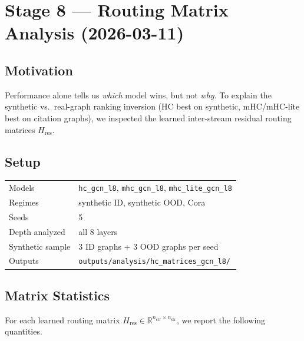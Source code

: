 \documentclass[11pt,a4paper]{article}
\begin{document}
\section{Stage 8 --- Routing Matrix Analysis (2026-03-11)}
\label{sec:matrix-analysis}

\subsection{Motivation}

Performance alone tells us \emph{which} model wins, but not \emph{why}.
To explain the synthetic vs.\ real-graph ranking inversion
(HC best on synthetic, mHC/mHC-lite best on citation graphs),
we inspected the learned inter-stream residual routing matrices
$H_{\mathrm{res}}$.

\subsection{Setup}

\begin{table}[h]
\centering
\begin{tabular}{L{4.2cm} L{7.2cm}}
\toprule
Models & \texttt{hc\_gcn\_l8}, \texttt{mhc\_gcn\_l8}, \texttt{mhc\_lite\_gcn\_l8} \\
Regimes & synthetic ID, synthetic OOD, Cora \\
Seeds & 5 \\
Depth analyzed & all 8 layers \\
Synthetic sample & 3 ID graphs + 3 OOD graphs per seed \\
Outputs & \texttt{outputs/analysis/hc\_matrices\_gcn\_l8/} \\
\bottomrule
\end{tabular}
\end{table}

\subsection{Matrix Statistics}

For each learned routing matrix $H_{\mathrm{res}} \in \mathbb{R}^{n_{\mathrm{str}}\times n_{\mathrm{str}}}$,
we report the following quantities.
\end{document}
